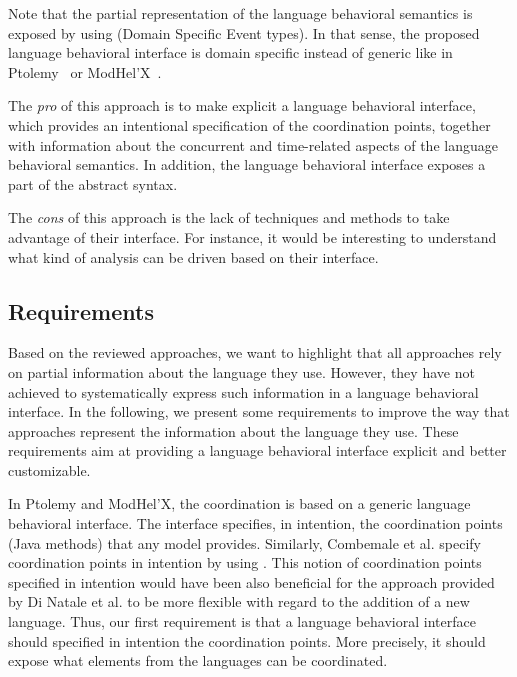{Note that the partial representation of the language behavioral semantics is exposed by using \dse (Domain Specific Event types). In that sense, the proposed language behavioral interface is domain specific instead of generic like in Ptolemy~\cite{ptoleframebib} or ModHel'X~\cite{modhelxbib}. 

The \emph{pro} of this approach is to make explicit a language behavioral interface, which provides an intentional specification of the coordination points, together with information about the concurrent and time-related aspects of the language behavioral semantics. In addition, the language behavioral interface exposes a part of the abstract syntax.   

The \emph{cons} of this approach is the lack of techniques and methods to take advantage of their interface. For instance, it would be interesting to understand what kind of analysis can be driven based on their interface.



\subsection{Requirements}
Based on the reviewed approaches, we want to highlight that all approaches rely on partial information about the language they use. However, they have not achieved to systematically express such information in a language behavioral interface. In the following, we present some requirements to improve the way that approaches represent the information about the language they use. These requirements aim at providing a language behavioral interface explicit and better customizable.     

In Ptolemy and ModHel'X, the coordination is based on a generic language behavioral interface. The interface specifies, in intention, the coordination points (\ie Java methods) that any model provides. Similarly, Combemale et al. specify coordination points in intention by using \dse. This notion of coordination points specified in intention would have been also beneficial for the approach provided by Di Natale et al. to be more flexible with regard to the addition of a new language. Thus, our first requirement is that a language behavioral interface should specified in intention the coordination points. More precisely, it should expose what elements from the languages can be coordinated.

}
